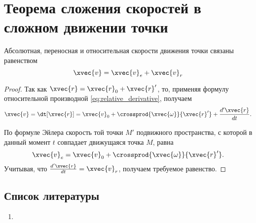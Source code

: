 \section{Теорема сложения скоростей в сложном движении точки}

\begin{theorem}
  \label{theorem:velocity_summation}
  Абсолютная, переносная и относительная скорости движения точки связаны
  равенством
  \begin{equation}
    \label{eq:velocity_summation}
    \xvec{v} = \xvec{v}_e + \xvec{v}_r
  \end{equation}
\end{theorem}

\begin{proof}
  Так как $\xvec{r} = \xvec{r}_0 + \xvec{r}'$, то, применяя формулу
  относительной производной \ref{eq:relative_derivative}, получаем
  \begin{equation*}
    \xvec{v} = \dt[\xvec{r}] = \xvec{v}_0
      + \crossprod{\xvec{\omega}}{\xvec{r}'}
      + \frac{d' \xvec{r}}{dt}.
  \end{equation*}

  По формуле Эйлера скорость той точки $M'$ подвижного пространства, с которой в
  данный момент $t$ совпадает движущаяся точка $M$, равна
  \begin{equation*}
    \xvec{v}_e = \xvec{v}_0 + \crossprod{\xvec{\omega}}{\xvec{r}'}.
  \end{equation*}
  Учитывая, что $\frac{d' \xvec{r}}{dt} = \xvec{v}_r$, получаем требуемое
  равенство.
\end{proof}

\subsection{Список литературы}
\begin{enumerate}
  \item \cite{lectures}
\end{enumerate}

